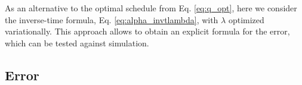 \documentclass[reprint, floatfix]{revtex4-1}
\begin{document}
As an alternative to the
optimal schedule from Eq. \eqref{eq:q_opt},
%
here we consider the inverse-time formula,
Eq. \eqref{eq:alpha_invtlambda},
with $\lambda$ optimized variationally.
%
This approach allows to obtain
an explicit formula for the error,
which can be tested against simulation.
%



\subsection{\label{sec:invt_error}
Error
}
\end{document}
